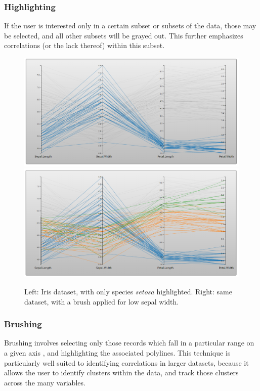 \documentclass[]{article}
\begin{document}
		\subsubsection{Highlighting}
			If the user is interested only in a certain subset or subsets of the data, those may be selected, and all other subsets will be grayed out. This further emphasizes correlations (or the lack thereof) within this subset.
		\begin{figure}[h]
			\includegraphics[width=\linewidth/2]{highlight.png}
			\includegraphics[width=\linewidth/2]{brush.png}
			\caption{Left: Iris dataset, with only species \textit{setosa} highlighted. Right: same dataset, with a brush applied for low sepal width.}
			\label{fig:Brush/Highlight}
		\end{figure}
		\subsubsection{Brushing}
			Brushing involves selecting only those records which fall in a particular range on a given axis \cite{bostock,kosara}, and highlighting the associated polylines. This technique is particularly well suited to identifying correlations in larger datasets, because it allows the user to identify clusters within the data, and track those clusters across the many variables.
			
\end{document}
